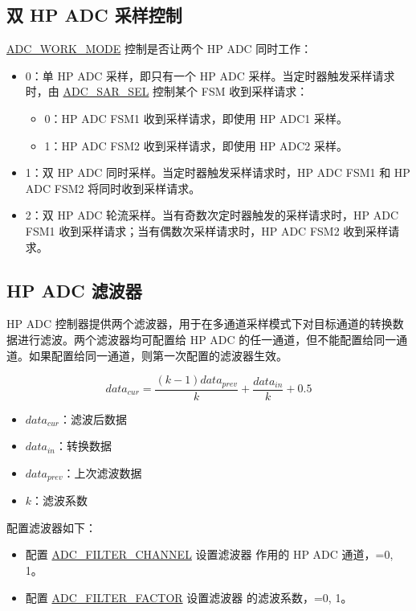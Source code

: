 \documentclass[main\_\_CN.tex]{subfiles}
\begin{document}
\subsection{双 HP ADC 采样控制}

\hyperref[fielddesc:ADCWORKMODE]{ADC\_WORK\_MODE} 控制是否让两个 HP ADC 同时工作：
\begin{itemize}
    \item 0：单 HP ADC 采样，即只有一个 HP ADC 采样。当定时器触发采样请求时，由 \hyperref[fielddesc:ADCSARSEL]{ADC\_SAR\_SEL} 控制某个 FSM 收到采样请求：
        \begin{itemize}
            \item 0：HP ADC FSM1 收到采样请求，即使用 HP ADC1 采样。
            \item 1：HP ADC FSM2 收到采样请求，即使用 HP ADC2 采样。
        \end{itemize}
    \item 1：双 HP ADC 同时采样。当定时器触发采样请求时，HP ADC FSM1 和 HP ADC FSM2 将同时收到采样请求。
    \item 2：双 HP ADC 轮流采样。当有奇数次定时器触发的采样请求时，HP ADC FSM1 收到采样请求；当有偶数次采样请求时，HP ADC FSM2 收到采样请求。
\end{itemize}

\subsection{HP ADC 滤波器}\label{sec:adc_filter}

HP ADC 控制器提供两个滤波器，用于在多通道采样模式下对目标通道的转换数据进行滤波。两个滤波器均可配置给 HP ADC 的任一通道，但不能配置给同一通道。如果配置给同一通道，则第一次配置的滤波器生效。

\[data_{cur} = \frac{(k-1)data_{prev}}{k}+\frac{data_{in}}{k}+0.5\]

\begin{itemize}
    \item \(data_{cur}\)：滤波后数据
    \item \(data_{in}\)：转换数据
    \item \(data_{prev}\)：上次滤波数据
    \item \(k\)：滤波系数
\end{itemize}

配置滤波器如下：
\begin{itemize}
\item 配置 \hyperref[fielddesc:ADCFILTERCHANNEL0]{ADC\_FILTER\_CHANNEL} 设置滤波器  作用的 HP ADC 通道，=0, 1。
\item 配置 \hyperref[fielddesc:ADCFILTERFACTOR0]{ADC\_FILTER\_FACTOR} 设置滤波器  的滤波系数，=0, 1。
\end{itemize}
\end{document}
